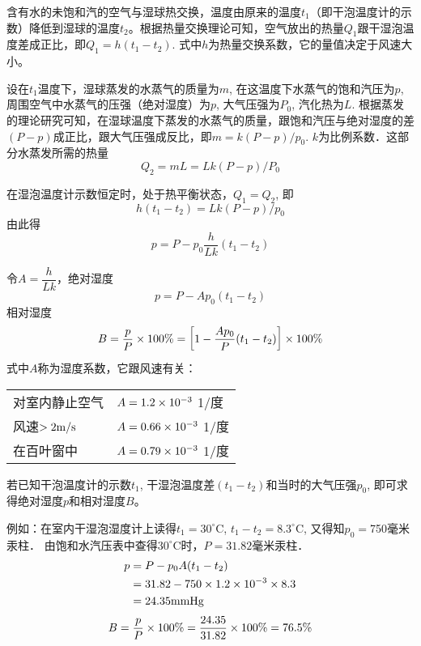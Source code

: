 含有水的未饱和汽的空气与湿球热交换，温度由原来的温度$t_1$（即干泡温度计的示数）降低到湿球的温度$t_2$。根据热量交换理论可知，空气放出的热量$Q_1$跟干湿泡温度差成正比，即$Q_1=h(t_1-t_2)$. 式中$h$为热量交换系数，它的量值决定于风速大小。

设在$t_1$温度下，湿球蒸发的水蒸气的质量为$m$, 在这温度下水蒸气的饱和汽压为$p$, 周围空气中水蒸气的压强（绝对湿度）为$p$, 大气压强为$P_0$, 汽化热为$L$. 根据蒸发的理论研究可知，在湿球温度下蒸发的水蒸气的质量，跟饱和汽压与绝对湿度的差$(P-p)$成正比，跟大气压强成反比，即$m=k(P-p)/p_0$. $k$为比例系数．这部分水蒸发所需的热量
\[Q_2=mL=Lk (P-p) /P_0\]

在湿泡温度计示数恒定时，处于热平衡状态，$Q_1=Q_2$, 即
\[h (t_1-t_2) =Lk (P-p) /p_0\]
由此得
\[p=P-p_0 \frac{h}{Lk} (t_1-t_2) \]

令$A=\dfrac{h}{Lk}$，绝对湿度
\[p=P-Ap_0(t_1-t_2)\]
相对湿度
\[B=\frac{p}{P}\times 100\%=\left[1-\frac{Ap_0}{P}(t_1-t_2)\right]\times 100\%\]
式中$A$称为湿度系数，它跟风速有关：
\begin{center}
  \begin{tabular}{p{}l}
    对室内静止空气& $A=1.2\times10^{-3}$ 1/度\\
风速$>2{\rm m/s}$& $A=0.66\times10^{-3}$ 1/度\\
在百叶窗中&  $A=0.79\times10^{-3}$ 1/度
  \end{tabular}
\end{center}

若已知干泡温度计的示数$t_1$, 干湿泡温度差$(t_1-t_2)$和当时的大气压强$p_0$, 即可求得绝对湿度$p$和相对湿度$B$。

例如：在室内干湿泡湿度计上读得$t_1=30^{\circ}$C, $t_1-t_2=8.3^{\circ}$C, 又得知$p_0=$750毫米汞柱．
由饱和水汽压表中查得$30^{\circ}$C时，$P=31.82$毫米汞柱．
\[\begin{split}
  p&=P-p_0A(t_1-t_2)\\
  &=31.82-750\times 1.2\times 10^{-3}\times 8.3\\
  &=24.35{\rm mmHg}
\end{split}\]
\[B=\frac{p}{P}\times100\%=\frac{24.35}{31.82}\times100\%=76.5\%\]

